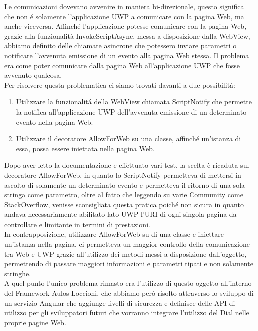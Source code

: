 Le comunicazioni dovevano avvenire in maniera bi-direzionale, questo significa che non é solamente l'applicazione UWP a comunicare con la pagina Web, ma anche viceversa. Affinché l'applicazione potesse comunicare con la pagina Web, grazie alla funzionalità InvokeScriptAsync, messa a disposizione dalla WebView, abbiamo definito delle chiamate asincrone che potessero inviare parametri o notificare l'avvenuta emissione di un evento alla pagina Web stessa. Il problema era come poter comunicare dalla pagina Web all'applicazione UWP che fosse avvenuto qualcosa.\\

Per risolvere questa problematica ci siamo trovati davanti a due possibilitá:

\begin{enumerate}
\item Utilizzare la funzionalitá della WebView chiamata ScriptNotify che permette la notifica all'applicazione UWP dell'avvenuta emissione di un determinato evento nella pagina Web.
\item Utilizzare il decoratore AllowForWeb su una classe, affinché un'istanza di essa, possa essere iniettata nella pagina Web.
\end{enumerate}

Dopo aver letto la documentazione e effettuato vari test, la scelta è ricaduta sul decoratore AllowForWeb, in quanto lo ScriptNotify permetteva di mettersi in ascolto di solamente un determinato evento e permetteva il ritorno di una sola stringa come parametro, oltre al fatto che leggendo su varie Community come StackOverflow, venisse sconsigliata questa pratica poiché non sicura in quanto andava necessariamente abilitato lato UWP l'URI di ogni singola pagina da controllare e limitante in termini di prestazioni.\\ 

In contrapposizione, utilizzare AllowForWeb su di una classe e iniettare un'istanza nella pagina, ci permetteva un maggior controllo della comunicazione tra Web e UWP grazie all'utilizzo dei metodi messi a disposizione dall'oggetto, permettendo di passare maggiori informazioni e parametri tipati e non solamente stringhe.\\ 

A quel punto l’unico problema rimasto era l’utilizzo di questo oggetto all’interno del Framework Aulos Loccioni, che abbiamo però risolto attraverso lo sviluppo di un servizio Angular che aggiunge livelli di sicurezza e definisce delle API di utilizzo per gli sviluppatori futuri che vorranno integrare l'utilizzo del Dial nelle proprie pagine Web.









